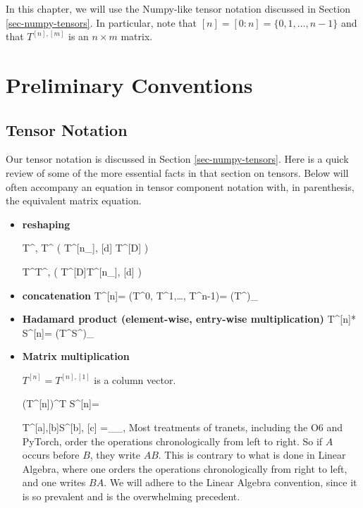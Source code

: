  In this chapter, we
 will use the Numpy-like tensor notation
 discussed in Section
 \ref{sec-numpy-tensors}. In particular, note that $[n] = [0:n] = \{0, 1,\ldots, n-1\}$ and that $T^{[n], [m]}$ is an $n\times m$ matrix.

\section{Preliminary Conventions}

\subsection{Tensor Notation}
Our tensor notation is discussed in Section
\ref{sec-numpy-tensors}.
Here is a quick review
of some of the more essential
facts in that section on tensors.
Below will often accompany
  an equation in tensor
  component notation
  with, in parenthesis, the equivalent matrix equation.



\begin{itemize}

\item{\bf reshaping}

\beq
T^{\nu, \delta}\rarrow T^{\Delta}
\;\;
\left(
T^{[n_\rvh], [d]} \rarrow T^{[D]}
\right)
\eeq

\beq
T^{\Delta}\rarrow T^{\nu, \delta}
\;\;
\left(
T^{[D]}\rarrow T^{[n_\rvh], [d]}
\right)
\eeq

\item {\bf concatenation}
\beq
T^{[n]}= (T^0, T^1,\ldots, T^{n-1})=
(T^\nu)_{\nu\in[n]}
\eeq

\item {\bf Hadamard product (element-wise, entry-wise multiplication)}
\beq
T^{[n]}* S^{[n]}= (T^\nu S^\nu)_{\nu\in[n]}
\eeq


\item {\bf Matrix multiplication}

$T^{[n]}= T^{[n], [1]}$ is a column vector.

\beq
(T^{[n]})^T S^{[n]}=
\eeq

\beq
T^{[a],[b]}S^{[b], [c]}
=
_{\alp_\in [a], \gamma \in [c]}
\eeq
Most treatments of tranets, including the
O6 and PyTorch,  order the
operations chronologically from
left to right. So if $A$ occurs before $B$,
they write $AB$.
This is contrary
to what is done in Linear Algebra, where one
orders the operations chronologically from right to left, and one writes $BA$.
We will adhere to the Linear Algebra
convention, since it is so prevalent
and is the overwhelming precedent.
\end{itemize}


